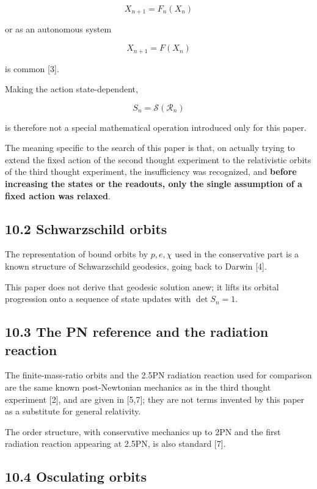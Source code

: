 \documentclass[
  a4paper,
]{article}
\begin{document}
\[
X_{n+1}=F_n(X_n)
\]

or as an autonomous system

\[
X_{n+1}=F(X_n)
\]

is common {[}3{]}.

Making the action state-dependent,

\[
S_n=\mathcal S(\mathcal R_n)
\]

is therefore not a special mathematical operation introduced only for
this paper.

The meaning specific to the search of this paper is that, on actually
trying to extend the fixed action of the second thought experiment to
the relativistic orbits of the third thought experiment, the
insufficiency was recognized, and \textbf{before increasing the states
or the readouts, only the single assumption of a fixed action was
relaxed}.

\subsection{10.2 Schwarzschild orbits}\label{schwarzschild-orbits}

The representation of bound orbits by \(p,e,\chi\) used in the
conservative part is a known structure of Schwarzschild geodesics, going
back to Darwin {[}4{]}.

This paper does not derive that geodesic solution anew; it lifts its
orbital progression onto a sequence of state updates with
\(\det S_n=1\).

\subsection{10.3 The PN reference and the radiation
reaction}\label{the-pn-reference-and-the-radiation-reaction}

The finite-mass-ratio orbits and the 2.5PN radiation reaction used for
comparison are the same known post-Newtonian mechanics as in the third
thought experiment {[}2{]}, and are given in {[}5,7{]}; they are not
terms invented by this paper as a substitute for general relativity.

The order structure, with conservative mechanics up to 2PN and the first
radiation reaction appearing at 2.5PN, is also standard {[}7{]}.

\subsection{10.4 Osculating orbits}\label{osculating-orbits}
\end{document}
